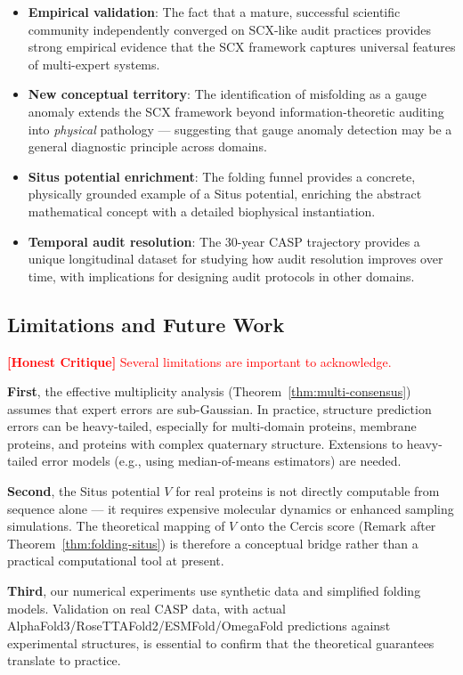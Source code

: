 \documentclass[12pt,a4paper]{article}
\theoremstyle{remark}
\newcommand{\honestcrit}[1]{\textcolor{red}{\textbf{[Honest Critique]} #1}}
\begin{document}
\begin{itemize}[leftmargin=*]
    \item \textbf{Empirical validation}: The fact that a mature, successful scientific community independently converged on SCX-like audit practices provides strong empirical evidence that the SCX framework captures universal features of multi-expert systems.
    \item \textbf{New conceptual territory}: The identification of misfolding as a gauge anomaly extends the SCX framework beyond information-theoretic auditing into \emph{physical} pathology — suggesting that gauge anomaly detection may be a general diagnostic principle across domains.
    \item \textbf{Situs potential enrichment}: The folding funnel provides a concrete, physically grounded example of a Situs potential, enriching the abstract mathematical concept with a detailed biophysical instantiation.
    \item \textbf{Temporal audit resolution}: The 30-year CASP trajectory provides a unique longitudinal dataset for studying how audit resolution improves over time, with implications for designing audit protocols in other domains.
\end{itemize}

\subsection{Limitations and Future Work}

\honestcrit{Several limitations are important to acknowledge.}

\textbf{First}, the effective multiplicity analysis (Theorem~\ref{thm:multi-consensus}) assumes that expert errors are sub-Gaussian.
In practice, structure prediction errors can be heavy-tailed, especially for multi-domain proteins, membrane proteins, and proteins with complex quaternary structure.
Extensions to heavy-tailed error models (e.g., using median-of-means estimators) are needed.

\textbf{Second}, the Situs potential $V$ for real proteins is not directly computable from sequence alone — it requires expensive molecular dynamics or enhanced sampling simulations.
The theoretical mapping of $V$ onto the Cercis score (Remark after Theorem~\ref{thm:folding-situs}) is therefore a conceptual bridge rather than a practical computational tool at present.

\textbf{Third}, our numerical experiments use synthetic data and simplified folding models.
Validation on real CASP data, with actual AlphaFold3/RoseTTAFold2/ESMFold/OmegaFold predictions against experimental structures, is essential to confirm that the theoretical guarantees translate to practice.
\end{document}
